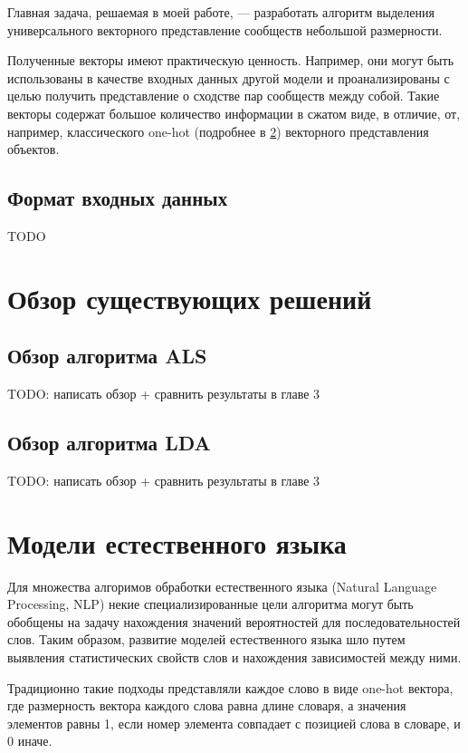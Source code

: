 \documentclass[times,specification,annotation]{itmo-student-thesis}
\begin{document}
Главная задача, решаемая в моей работе, --- разработать алгоритм выделения универсального векторного представление сообществ небольшой размерности. 

Полученные векторы имеют практическую ценность. Например, они могут быть использованы в
качестве входных данных другой модели и проанализированы с целью
получить представление о сходстве пар сообществ между собой. Такие векторы содержат большое количество информации в сжатом виде, в отличие, от, например, классического one-hot (подробнее в \ref{sec:nlp-intro}) векторного представления объектов.

\subsection{Формат входных данных}

TODO

\section{Обзор существующих решений}

\subsection{Обзор алгоритма ALS}\label{sec:als}

TODO: написать обзор + сравнить результаты в главе 3

\subsection{Обзор алгоритма LDA}\label{sec:lda}

TODO: написать обзор + сравнить результаты в главе 3

\section{Модели естественного языка}\label{sec:nlp-intro}

Для множества алгоримов обработки естественного языка (Natural Language Processing, NLP) некие специализированные цели алгоритма могут быть обобщены на задачу нахождения значений вероятностей для последовательностей слов.
Таким образом, развитие моделей естественного языка шло путем выявления статистических свойств слов и нахождения зависимостей между ними.

Традиционно такие подходы представляли каждое слово в виде one-hot вектора, где размерность вектора каждого слова равна длине словаря, а значения элементов равны 1, если номер элемента совпадает с позицией слова в словаре, и 0 иначе.  
\end{document}
